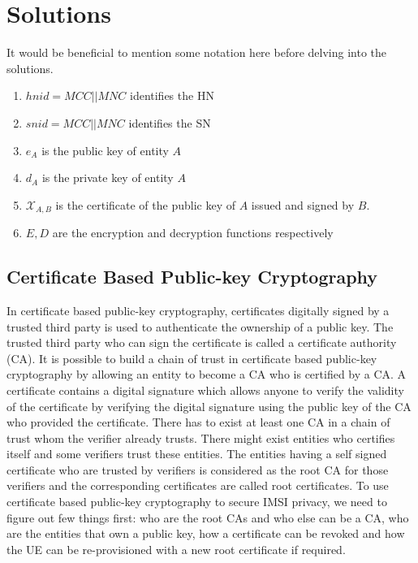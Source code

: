 \documentclass[lnicst,sechang,a4paper]{svmultln}
\begin{document}
\section{Solutions}\label{sec:solutions} 
\label{sec:solutions}
It would be beneficial to mention some notation here before delving into the solutions. 
\begin{enumerate}
\item $hnid=MCC||MNC$ identifies the HN
\item $snid=MCC||MNC$ identifies the SN
\item $e_A$ is the public key of entity $A$
\item $d_A$ is the private key of entity $A$ 
\item $\mathcal{X}_{A,B}$ is the certificate of the public key of $A$ issued and signed by $B$. 
\item $E,D$ are the encryption and decryption functions respectively
\end{enumerate}


\subsection{Certificate Based Public-key Cryptography} 
\label{sub_sec:solution_certificate}
In certificate based public-key cryptography, certificates digitally signed by a trusted third party is used to authenticate the ownership of a public key. The trusted third party who can sign the certificate is called a certificate authority (CA). It is possible to build a chain of trust in certificate based public-key cryptography by allowing an entity to become a CA who is certified by a CA. A certificate contains a digital signature which allows anyone to verify the validity of the certificate by verifying the digital signature using the public key of the CA who provided the certificate. There has to exist at least one CA in a chain of trust whom the verifier already trusts. There might exist entities who certifies itself and some verifiers trust these entities. The entities having a self signed certificate who are trusted by verifiers is considered as the root CA for those verifiers and the corresponding certificates are called root certificates. To use certificate based public-key cryptography to secure IMSI privacy, we need to figure out few things first: who are the root CAs and who else can be a CA, who are the entities that own a public key, how a certificate can be revoked and how the UE can be re-provisioned with a new root certificate if required.
\end{document}
